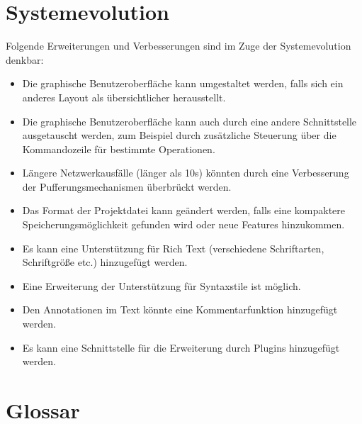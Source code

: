 \documentclass{scrartcl}
\begin{document}
\section{Systemevolution}
Folgende Erweiterungen und Verbesserungen sind im Zuge der Systemevolution denkbar:

\begin{itemize}
\item Die graphische Benutzeroberfläche kann umgestaltet werden, falls sich ein anderes Layout als übersichtlicher herausstellt.
\item Die graphische Benutzeroberfläche kann auch durch eine andere Schnittstelle ausgetauscht werden, zum Beispiel durch zusätzliche Steuerung über die Kommandozeile für bestimmte Operationen.
\item Längere Netzwerkausfälle (länger als 10s) könnten durch eine Verbesserung der Pufferungsmechanismen überbrückt werden.
\item Das Format der Projektdatei kann geändert werden, falls eine kompaktere Speicherungsmöglichkeit gefunden wird oder neue Features hinzukommen.
\item Es kann eine Unterstützung für Rich Text (verschiedene Schriftarten, Schriftgröße etc.) hinzugefügt werden.
\item Eine Erweiterung der Unterstützung für Syntaxstile ist möglich.
\item Den Annotationen im Text könnte eine Kommentarfunktion hinzugefügt werden.
\item Es kann eine Schnittstelle für die Erweiterung durch Plugins hinzugefügt werden.
\end{itemize}

\newpage

\section{Glossar}

\newcolumntype{b}{X}
\end{document}
